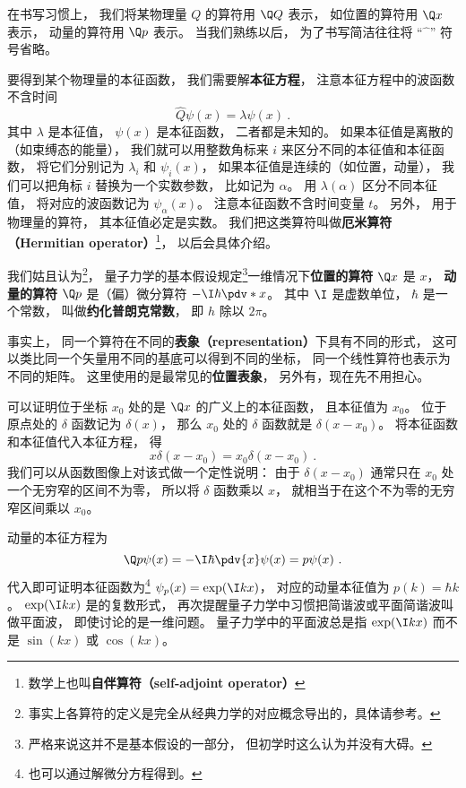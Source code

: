 在书写习惯上， 我们将某物理量 $Q$ 的算符用 $\Q Q$ 表示， 如位置的算符用 $\Q x$ 表示， 动量的算符用 $\Q p$ 表示。 当我们熟练以后， 为了书写简洁往往将 “$\hat{\phantom{x}}$” 符号省略。

要得到某个物理量的本征函数， 我们需要解\textbf{本征方程}， 注意本征方程中的波函数不含时间
\begin{equation}
\hat Q \psi(x) = \lambda \psi(x)~.
\end{equation}
其中 $\lambda$ 是本征值， $\psi(x)$ 是本征函数， 二者都是未知的。 如果本征值是离散的（如束缚态的能量）， 我们就可以用整数角标来 $i$ 来区分不同的本征值和本征函数， 将它们分别记为 $\lambda_i$ 和 $\psi_i(x)$， 如果本征值是连续的（如位置，动量）， 我们可以把角标 $i$ 替换为一个实数参数， 比如记为 $\alpha$。 用 $\lambda(\alpha)$ 区分不同本征值， 将对应的波函数记为 $\psi_\alpha(x)$。 注意本征函数不含时间变量 $t$。 另外， 用于物理量的算符， 其本征值必定是实数。 我们把这类算符叫做\textbf{厄米算符（Hermitian operator）}\footnote{数学上也叫\textbf{自伴算符（self-adjoint operator）}}， 以后会具体介绍。

我们姑且认为\footnote{事实上各算符的定义是完全从经典力学的对应概念导出的，具体请参考。}， 量子力学的基本假设规定\footnote{严格来说这并不是基本假设的一部分， 但初学时这么认为并没有大碍。}一维情况下\textbf{位置的算符} $\Q x$ 是 $x$， \textbf{动量的算符} $\Q p$ 是（偏）微分算符 $-\I\hbar \pdv*{x}$。 其中 $\I$ 是虚数单位， $\hbar$ 是一个常数， 叫做\textbf{约化普朗克常数}， 即 $h$ 除以 $2\pi$。

事实上， 同一个算符在不同的\textbf{表象（representation）}下具有不同的形式， 这可以类比同一个矢量用不同的基底可以得到不同的坐标， 同一个线性算符也表示为不同的矩阵。%
这里使用的是最常见的\textbf{位置表象}， 另外有，现在先不用担心。

可以证明位于坐标 $x_0$ 处的是 $\Q x$ 的广义上的本征函数， 且本征值为 $x_0$。 位于原点处的 $\delta$ 函数记为 $\delta(x)$， 那么 $x_0$ 处的 $\delta$ 函数就是 $\delta (x - x_0)$。 将本征函数和本征值代入本征方程， 得
\begin{equation}
x \delta(x - x_0) = x_0 \delta(x - x_0)~.
\end{equation}
我们可以从函数图像上对该式做一个定性说明： 由于 $\delta(x - x_0)$ 通常只在 $x_0$ 处一个无穷窄的区间不为零， 所以将 $\delta$ 函数乘以 $x$， 就相当于在这个不为零的无穷窄区间乘以 $x_0$。

动量的本征方程为
\begin{equation}
\Q p \psi(x) = -\I\hbar \pdv{x} \psi(x) = p \psi(x)~.
\end{equation}
代入即可证明本征函数为\footnote{也可以通过解微分方程得到。} $\psi_p(x) = \exp(\I k x)$， 对应的动量本征值为 $p(k) = \hbar k$。 $\exp(\I k x)$ 是的复数形式， 再次提醒量子力学中习惯把简谐波或平面简谐波叫做平面波， 即使讨论的是一维问题。 量子力学中的平面波总是指 $\exp(\I k x)$ 而不是 $\sin(kx)$ 或 $\cos(kx)$。

